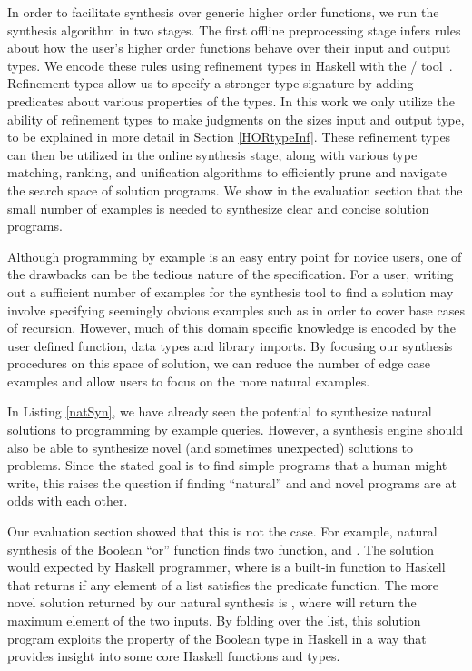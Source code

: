 In order to facilitate synthesis over generic higher order functions, we run the synthesis algorithm in two stages. The first offline preprocessing stage infers rules about how the user's higher order functions behave over their input and output types. We encode these rules using refinement types in Haskell with the \lhask/ tool~\cite{DBLP:conf/haskell/VazouSJ14}. Refinement types allow us to specify a stronger type signature by adding predicates about various properties of the types. In this work we only utilize the ability of refinement types to make judgments on the sizes input and output type, to be explained in more detail in Section \ref{HORtypeInf}. These refinement types can then be utilized in the online synthesis stage, along with various type matching, ranking, and unification algorithms to efficiently prune and navigate the search space of solution programs. We show in the evaluation section that the small number of examples is needed to synthesize clear and concise solution programs.

Although programming by example is an easy entry point for novice
users, one of the drawbacks can be the tedious nature of the
specification.  For a user, writing out a sufficient number of
examples for the synthesis tool to find a solution may involve
specifying seemingly obvious examples such as \codeinline{[]->[]} in order to cover base cases of recursion.  However, much of this domain specific knowledge is encoded by the user defined function, data types and library imports.  By focusing our synthesis procedures on this space of solution, we can reduce the number of edge case examples and allow users to focus on the more natural examples.

In Listing \ref{natSyn}, we have already seen the potential to synthesize natural solutions to programming by example queries.
However, a synthesis engine should also be able to synthesize novel (and sometimes unexpected) solutions to problems. 
Since the stated goal is to find simple programs that a human might write, this raises the question if finding ``natural'' and and novel programs are at odds with each other.


Our evaluation section showed that this is not the case.
For example, natural synthesis of the Boolean ``or'' function finds two function,  and .
The  solution would expected by Haskell programmer, where  is a built-in function to Haskell that returns  if any element of a list satisfies the predicate function. 
The more novel solution returned by our natural synthesis is , where  will return the maximum element of the two inputs.
By folding over the list, this solution program exploits the  property of the Boolean type in Haskell in a way that provides insight into some core Haskell functions and types.

